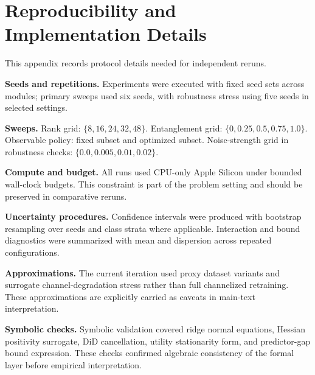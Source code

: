 \begin{table}[t]
\caption{Extended channel-transfer metrics for the robustness module. The table reports ranking correlations and error-rate shifts across channel families and strengths, complementing . These values are informative for failure-mode monitoring but are not used to support broad hardware-agnostic claims without full retraining experiments.}
\label{tab:channel}
\centering
\small
\renewcommand{\arraystretch}{1.1}
\setlength{\tabcolsep}{4pt}
\resizebox{\linewidth}{!}{}
\end{table}

\section{Reproducibility and Implementation Details}\label{app:repro}
This appendix records protocol details needed for independent reruns.

\textbf{Seeds and repetitions.} Experiments were executed with fixed seed sets across modules; primary sweeps used six seeds, with robustness stress using five seeds in selected settings.

\textbf{Sweeps.} Rank grid: $\{8,16,24,32,48\}$. Entanglement grid: $\{0,0.25,0.5,0.75,1.0\}$. Observable policy: fixed subset and optimized subset. Noise-strength grid in robustness checks: $\{0.0,0.005,0.01,0.02\}$.

\textbf{Compute and budget.} All runs used CPU-only Apple Silicon under bounded wall-clock budgets. This constraint is part of the problem setting and should be preserved in comparative reruns.

\textbf{Uncertainty procedures.} Confidence intervals were produced with bootstrap resampling over seeds and class strata where applicable. Interaction and bound diagnostics were summarized with mean and dispersion across repeated configurations.

\textbf{Approximations.} The current iteration used proxy dataset variants and surrogate channel-degradation stress rather than full channelized retraining. These approximations are explicitly carried as caveats in main-text interpretation.

\textbf{Symbolic checks.} Symbolic validation covered ridge normal equations, Hessian positivity surrogate, DiD cancellation, utility stationarity form, and predictor-gap bound expression. These checks confirmed algebraic consistency of the formal layer before empirical interpretation.

